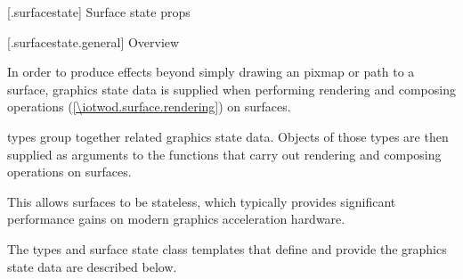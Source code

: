 
 [\iotwod.surfacestate] {Surface state props}

 [\iotwod.surfacestate.general] {Overview}

\pnum
In order to produce effects beyond simply drawing an pixmap or path to a surface, graphics state data is supplied when performing rendering and composing operations (\ref{\iotwod.surface.rendering}) on surfaces.

\pnum
{} types group together related graphics state data. Objects of those types are then supplied as arguments to the functions that carry out rendering and composing operations on surfaces. \begin{note}This allows surfaces to be stateless, which typically provides significant performance gains on modern graphics acceleration hardware.\end{note}

\pnum
The  types and surface state class templates that define and provide the graphics state data are described below.

\addtocounter{SectionDepthBase}{1}













\addtocounter{SectionDepthBase}{-1}
